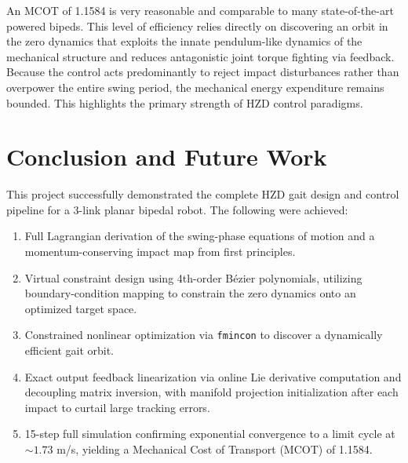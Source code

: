 \documentclass[conference]{IEEEtran}
\begin{document}
An MCOT of 1.1584 is very reasonable and comparable to many state-of-the-art powered bipeds. This level of efficiency relies directly on discovering an orbit in the zero dynamics that exploits the innate pendulum-like dynamics of the mechanical structure and reduces antagonistic joint torque fighting via feedback. Because the control acts predominantly to reject impact disturbances rather than overpower the entire swing period, the mechanical energy expenditure remains bounded. This highlights the primary strength of HZD control paradigms.

\section{Conclusion and Future Work}

This project successfully demonstrated the complete HZD gait design and control pipeline for a 3-link planar bipedal robot. The following were achieved:

\begin{enumerate}
    \item Full Lagrangian derivation of the swing-phase equations of motion and a momentum-conserving impact map from first principles.
    \item Virtual constraint design using 4th-order B\'ezier polynomials, utilizing boundary-condition mapping to constrain the zero dynamics onto an optimized target space.
    \item Constrained nonlinear optimization via \texttt{fmincon} to discover a dynamically efficient gait orbit.
    \item Exact output feedback linearization via online Lie derivative computation and decoupling matrix inversion, with manifold projection initialization after each impact to curtail large tracking errors.
    \item 15-step full simulation confirming exponential convergence to a limit cycle at $\sim 1.73$ m/s, yielding a Mechanical Cost of Transport (MCOT) of 1.1584.
\end{enumerate}
\end{document}
